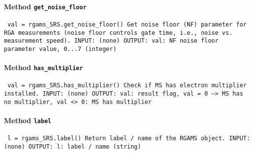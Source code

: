 \paragraph{Method \texttt{get_noise_floor}}
\vspace{1ex}
\texttt{\newline
val = rgams_SRS.get_noise_floor()\newline
\newline
Get noise floor (NF) parameter for RGA measurements (noise floor controls gate time, i.e., noise vs. measurement speed).\newline
\newline
INPUT:\newline
(none)\newline
\newline
OUTPUT:\newline
val: NF noise floor parameter value, 0...7 (integer)\newline
\newline
}

\paragraph{Method \texttt{has_multiplier}}
\vspace{1ex}
\texttt{\newline
val = rgams_SRS.has_multiplier()\newline
\newline
Check if MS has electron multiplier installed.\newline
\newline
INPUT:\newline
(none)\newline
\newline
OUTPUT:\newline
val: result flag, val = 0 --> MS has no multiplier, val <> 0: MS has multiplier\newline
\newline
}

\paragraph{Method \texttt{label}}
\vspace{1ex}
\texttt{\newline
l = rgams_SRS.label()\newline
\newline
Return label / name of the RGAMS object.\newline
\newline
INPUT:\newline
(none)\newline
\newline
OUTPUT:\newline
l: label / name (string)\newline
\newline
}

